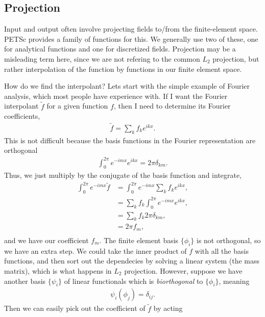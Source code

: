 \subsection{Projection}

Input and output often involve projecting fields to/from the
finite-element space. PETSc provides a family of functions for
this. We generally use two of these, one for analytical functions and
one for discretized fields. Projection may be a misleading term here,
since we are not refering to the common $L_2$ projection, but rather
interpolation of the function by functions in our finite element
space.

How do we find the interpolant? Lets start with the simple example of
Fourier analysis, which most people have experience with. If I want
the Fourier interpolant $\tilde f$ for a given function $f$, then I
need to determine its Fourier coefficients,
\begin{align}
  \tilde f = \sum_k f_k e^{i k x}.
\end{align}
This is not difficult because the basis functions in the Fourier
representation are orthogonal
\begin{align}
  \int^{2\pi}_0 e^{-i m x} e^{i k x} = 2\pi \delta_{km}.
\end{align}
Thus, we just multiply by the conjugate of the basis function and integrate,
\begin{align}
  \int^{2\pi}_0 e^{-i m x} \tilde f &= \int^{2\pi}_0 e^{-i m x} \sum_k f_k e^{i k x}, \\
                                  &= \sum_k f_k \int^{2\pi}_0 e^{-i m x} e^{i k x}, \\
                                  &= \sum_k f_k 2\pi \delta_{km}, \\
                                  &= 2\pi f_m, \\
\end{align}
and we have our coefficient $f_m$. The finite element basis
$\{\phi_i\}$ is not orthogonal, so we have an extra step. We could
take the inner product of $f$ with all the basis functions, and then
sort out the dependecies by solving a linear system (the mass matrix),
which is what happens in $L_2$ projection. However, suppose we have
another basis $\{\psi_i\}$ of linear functionals which is
\textit{biorthogonal} to $\{\phi_i\}$, meaning
\begin{align}
  \psi_i(\phi_j) = \delta_{ij}.
\end{align}
Then we can easily pick out the coefficient of $\tilde f$ by acting
